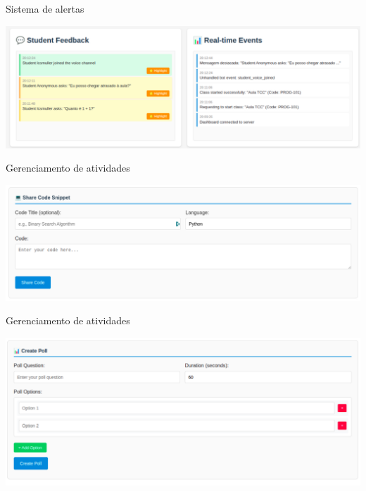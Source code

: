 \documentclass[aspectratio=169]{beamer}
\begin{document}
{\begin{frame}{Sistema de alertas}
  \begin{center}
    \includegraphics[width=1.1\textwidth]{func-professores/3.png}
  \end{center}
\end{frame}

\begin{frame}{Gerenciamento de atividades}
  \begin{center}
    \includegraphics[width=1.0\textwidth]{func-professores/6.png}
  \end{center}
\end{frame}

\begin{frame}{Gerenciamento de atividades}
  \begin{center}
    \includegraphics[width=1.0\textwidth]{func-professores/7.png}
  \end{center}
\end{frame}

}
\end{document}
